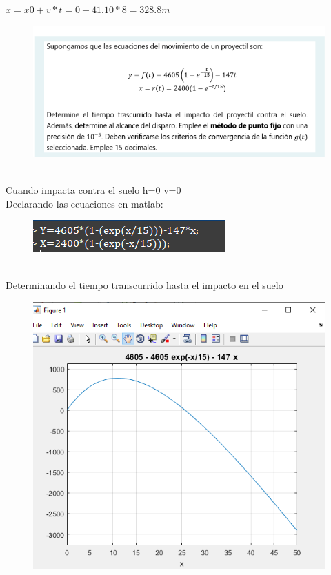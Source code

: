 \documentclass{article}
\theoremstyle{mytheoremstyle}
\theoremstyle{mytheoremstyle}
\theoremstyle{myproblemstyle}
\begin{document}
\\$x=x0+v*t= 0+41.10*8=328.8m$
\pagebreak
\begin{figure}[ht]
    \includegraphics[scale=0.8]{img/eje2_1.png}
 \end{figure}
\noindent \\Cuando impacta contra el suelo h=0 v=0
\\Declarando las ecuaciones en matlab:
\begin{figure}[ht]
    \includegraphics[scale=0.7]{img/eje2_2.png}
 \end{figure}
\\Determinando el tiempo transcurrido hasta el impacto en el suelo
\begin{figure}[ht]
    \includegraphics[scale=0.6]{img/eje2_3.png}
\end{figure}
\end{document}
